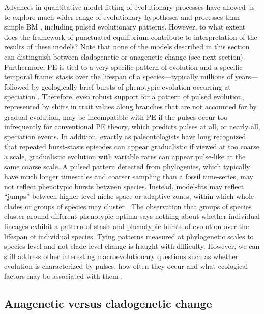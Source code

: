 Advances in quantitative model-fitting of evolutionary processes have allowed us to explore much wider range of evolutionary hypotheses and processes than simple BM \citep{PennellHarmon}, including pulsed evolutionary patterns. However, to what extent does the framework of punctuated equilibrium contribute to interpretation of the results of these models? Note that none of the models described in this section can distinguish between cladogenetic or anagenetic change (see next section). Furthermore, PE is tied to a very specific pattern of evolution and a specific temporal frame: stasis over the lifespan of a species---typically millions of years---followed by geologically brief bursts of phenotypic evolution occurring at speciation \citep{EldredgeGould1972, GouldEldredge1977, Gould2002}.  Therefore, even robust support for a pattern of pulsed evolution, represented by shifts in trait values along branches that are not accounted for by gradual evolution, may be incompatible with PE if the pulses occur too infrequently for conventional PE theory, which predicts pulses at all, or nearly all, speciation events. In addition, exactly as paleontologists have long recognized that repeated burst-stasis episodes can appear gradualistic if viewed at too coarse a scale, gradualistic evolution with variable rates can appear pulse-like at the same coarse scale. A pulsed pattern detected from phylogenies, which typically have much longer timescales and coarser sampling than a fossil time-series, may not reflect phenotypic bursts between species. Instead, model-fits may reflect ``jumps'' between higher-level niche space or adaptive zones, within which whole clades or groups of species may cluster \citep{Simpson1944, Hansen1997, Hansen2012book, Eastmanjump}. The observation that groups of species cluster around different phenotypic optima says nothing about whether individual lineages exhibit a pattern of stasis and phenotypic bursts of evolution over the lifespan of individual species. Tying patterns measured at phylogenetic scales to species-level and not clade-level change is fraught with difficulty. However, we can still address other interesting macroevolutionary questions such as whether evolution is characterized by pulses, how often they occur and what ecological factors may be associated with them \citep{Eastmanjump}.

\subsection{Anagenetic versus cladogenetic change}

